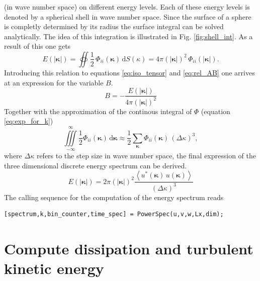 \documentclass[preprint,12pt,ntfdMod]{elsarticle}
\begin{document}
\begin{par}
(in wave number space) on different energy levels. Each of these energy levels is denoted by a spherical
shell in wave number space. Since the surface of a sphere is completly determined by its radius the
surface integral can be solved analytically. The idea of this integration is illustrated
in Fig. \ref{fig:shell_int}.
As a result of this one gets
  \begin{equation}
      E(|\boldsymbol\kappa|)=\oiint\frac{1}{2}\,\Phi_{ii}(\boldsymbol\kappa)\,\mathrm{d}S(\kappa)
      =4\pi(|\boldsymbol\kappa|)^2\,\Phi_{ii}(|\boldsymbol\kappa|).
  \end{equation}
Introducing this relation to equations \eqref{eq:iso_tensor} and
\eqref{eq:rel_AB} one arrives at an expression for the variable $B$.
  \begin{equation}
      B=-\frac{E(|\boldsymbol\kappa|)}{4\pi(|\boldsymbol\kappa|)^2}
  \end{equation}
Together with the approximation of the continous integral of $\Phi$
(equation \eqref{eq:exp_for_k})
  \begin{equation}
      \iiint\limits_{-\infty}^{\infty}\frac{1}{2}\Phi_{ii}(\boldsymbol\kappa)\,\mathrm{d}\boldsymbol\kappa
      \approx\frac{1}{2}\sum\limits_{\boldsymbol\kappa}\Phi_{ii}(\boldsymbol\kappa)\,(\Delta\kappa)^3,
  \end{equation}
where $\Delta\kappa$ refers to the step size in wave number space,
the final expression of the three dimensional discrete energy spectrum can be derived.
  \begin{equation}
      E(|\boldsymbol\kappa|)=2\pi(|\boldsymbol\kappa|)^2\frac{\left<u^{*}
      (\boldsymbol\kappa)\,u(\boldsymbol\kappa)\right>}{(\Delta\kappa)^3}
  \end{equation}
The calling sequence for the computation of the energy spectrum reads

\end{par} \vspace{1em}
\begin{verbatim}
[spectrum,k,bin_counter,time_spec] = PowerSpec(u,v,w,Lx,dim);
\end{verbatim}
\begin{par}



\end{par} \vspace{1em}


\section{Compute dissipation and turbulent kinetic energy}
\end{document}
